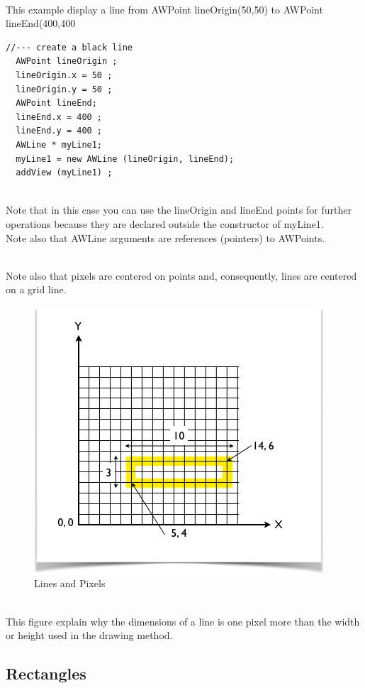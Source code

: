 \documentclass[a4paper,11pt]{extarticle}
\begin{document}
  ~\\ This example display a line from AWPoint lineOrigin(50,50) to AWPoint lineEnd(400,400

\begin{lstlisting}[language=Arduinonl]
//--- create a black line
  AWPoint lineOrigin ;
  lineOrigin.x = 50 ;
  lineOrigin.y = 50 ;
  AWPoint lineEnd;
  lineEnd.x = 400 ;
  lineEnd.y = 400 ;
  AWLine * myLine1;
  myLine1 = new AWLine (lineOrigin, lineEnd); 
  addView (myLine1) ;
 \end{lstlisting}
~\\ Note that in this case you can use the lineOrigin and lineEnd points for further operations because they are declared outside the constructor of myLine1.
~\\ Note also that AWLine arguments are references (pointers) to AWPoints.

~\\ Note also that pixels are centered on points and, consequently, lines are centered on a grid line.

\begin{figure}[htbp]
   \centering
   \includegraphics[scale=0.6]{AWFig5.png} 
   \caption{Lines and Pixels}
   \label{fig:5 }
\end{figure}

~\\ This figure explain why the dimensions of a line is one pixel more than the width or height used in the drawing method.

\newpage
\subsection{Rectangles}
\end{document}
